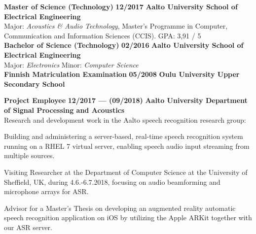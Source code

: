 \documentclass[8pt,a4paper,oneside]{article}
\newcommand{\myrule}{\vspace{0.5mm} {\color{lightgray}{\hrule height 0.5pt width \textwidth depth 0pt}} \vspace{1mm}}
\newcommand{\titledate}[2]{{\bfseries \color{textcolor}  \fontsize{11.5}{11.5}\selectfont #1} \hfill \textbf{#2} \myrule}
\newcommand{\workplace}[1]{{\bfseries \fontsize{10.5}{10.5}\selectfont #1}}
\newcommand{\sectitle}[1]{{\sc \bfseries \LARGE #1}}
\newcommand{\boxarc}{2.5mm}
\newcommand{\boxtop}{1.5mm}
\newcommand{\boxskip}{\vspace{0.9\baselineskip}}
\begin{document}
\vspace{0.5mm} %
	
\begin{minipage}[t]{0.638\textwidth}
	
	
	\begin{tcolorbox}[top=1mm,bottom=1mm,right=1mm,left=1mm,arc=\boxarc,toptitle=\boxtop,bottomtitle=1mm,title=\sectitle{Education},box align=top]
		\titledate{Master of Science (Technology)}{12/2017}
		\workplace{Aalto University School of Electrical Engineering} \\
		Major: \textit{Acoustics \& Audio Technology}, Master's Programme in Computer, Communication and Information Sciences (CCIS). GPA: 3,91 / 5 \\
		
		\titledate{Bachelor of Science (Technology)}{02/2016}
		\workplace{Aalto University School of Electrical Engineering} \\
		 \hspace*{0.25mm} {\large \textbullet} Major:  \textit{Electronics} \hspace{3mm} {\large \textbullet} Minor:  \textit{Computer Science} \\
		
		\titledate{Finnish Matriculation Examination}{05/2008}
		\workplace{Oulu University Upper Secondary School}
	\end{tcolorbox} \boxskip
	
	\begin{tcolorbox}[top=1mm,bottom=1mm,right=1mm,left=1mm,arc=\boxarc,toptitle=\boxtop,bottomtitle=1mm,title=\sectitle{Experience},box align=bottom]
		
		\titledate{Project Employee}{12/2017 --- (09/2018)}
		\workplace{Aalto University Department of Signal Processing and Acoustics} \\
		Research and development work in the Aalto speech recognition research group:
		\begin{cvlist}
			\item Building and administering a server-based, real-time speech recognition system running on a RHEL 7 virtual server, enabling speech audio input streaming from multiple sources.
			\item Visiting Researcher at the Department of Computer Science at the University of Sheffield, UK, during 4.6.-6.7.2018, focusing on audio beamforming and microphone arrays for ASR.
			\item Advisor for a Master's Thesis on developing an augmented reality automatic speech recognition application on iOS by utilizing the Apple ARKit together with our ASR server. \\
		\end{cvlist}
		

\end{tcolorbox}
\end{minipage}
\end{document}
